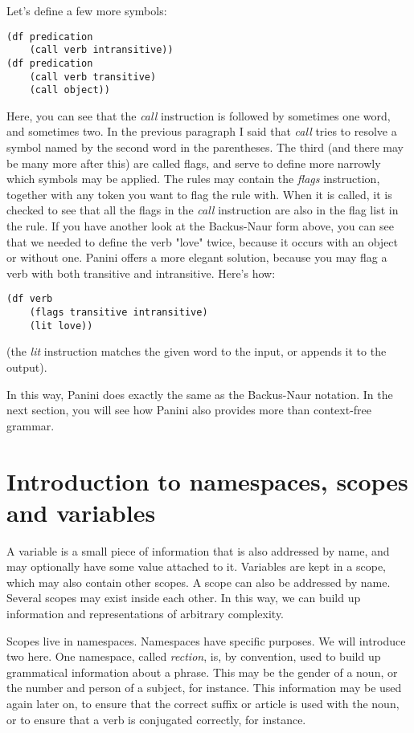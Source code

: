 \documentclass{article}
\begin{document}
Let's define a few more symbols:
\begin{lstlisting}
(df predication
	(call verb intransitive))
(df predication
	(call verb transitive)
	(call object))
\end{lstlisting}
Here, you can see that the \emph{call} instruction is followed by sometimes one word, and sometimes two. In the previous paragraph I
said that \emph{call} tries to resolve a symbol named by the second word in the parentheses. The third (and there may be many more
after this) are called flags, and serve to define more narrowly which symbols may be applied. The rules may contain the \emph{flags} 
instruction, together with any token you want to flag the rule with. When it is called, it is checked to see that all the flags in 
the \emph{call} instruction are also in the flag list in the rule. If you have another look at the Backus-Naur form above, you can 
see that we needed to define the verb "love" twice, because it occurs with an object or without one. 
Panini offers a more elegant solution, because you may flag a verb with both transitive and intransitive. Here's how:
\begin{lstlisting}
(df verb
	(flags transitive intransitive)
	(lit love))
\end{lstlisting}
(the \emph{lit} instruction matches the given word to the input, or appends it to the output).

In this way, Panini does exactly the same as the Backus-Naur notation. In the next section, you will see how Panini also provides
more than context-free grammar.

\section{Introduction to namespaces, scopes and variables}
A variable is a small piece of information that is also addressed by 
name, and may optionally have some value attached to it. Variables 
are kept in a scope, which may also contain other scopes. A scope 
can also be addressed by name. Several scopes may exist inside each 
other. In this way, we can build up information and representations 
of arbitrary complexity.

Scopes live in namespaces. Namespaces have specific purposes. We will 
introduce two here. One namespace, called \emph{rection}, is, by 
convention, used to build up grammatical information about a phrase. 
This may be the gender of a noun, or the number and person of a subject,
for instance. This information may be used again later on, to ensure 
that the correct suffix or article is used with the noun, or to ensure 
that a verb is conjugated correctly, for instance.
\end{document}
